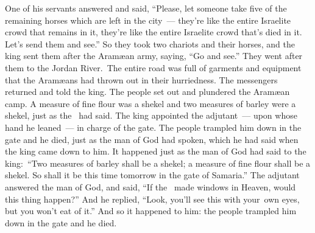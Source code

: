 \begin{inparaenum}
   One of his servants answered and said, ``Please, let someone take five of the remaining horses which are left in the city\understood{}~--- they're like the entire Israelite crowd that remains in it, they're like the entire Israelite crowd that's died in it. Let's send them and see.''%
   So they took two chariots and their horses, and the king sent them after the Aram\ae{}an army, saying, ``Go and see.''%
   They went after them to the Jordan River.\understood{}\ The entire road was full of garments and equipment that the Aram\ae{}ans had thrown out in their hurriedness. The messengers returned and told the king.%
   The people set out and plundered the Aram\ae{}an camp. A measure of fine flour was a shekel and two measures of barley were a shekel, just as the \lord\ had said.%
   The king appointed the adjutant~--- upon whose hand he leaned~--- in charge of the gate. The people trampled him down in the gate and he died, just as the man of God had spoken, which he had said when the king came down to him.%
   It happened just as the man of God had said to the king:\, ``Two measures of barley shall be a shekel; a measure of fine flour shall be a shekel. So shall it be this time tomorrow in the gate of Samaria.''%
   The adjutant answered the man of God, and said, ``If the \lord\ made windows in Heaven, would this thing happen?'' And he replied, ``Look, you'll see this with your\understood{}\ own eyes, but you won't eat of it.''%
   And so it happened to him: the people trampled him down in the gate and he died.%
\end{inparaenum}
